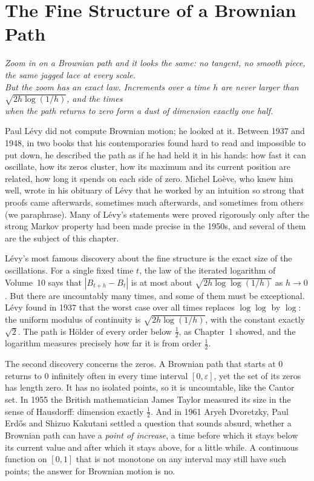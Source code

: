 \chapter{The Fine Structure of a Brownian Path}

\begin{center}\itshape
Zoom in on a Brownian path and it looks the same: no tangent, no smooth piece, the same jagged lace at every scale.\\
But the zoom has an exact law. Increments over a time $h$ are never larger than $\sqrt{2h\log(1/h)}$, and the times\\
when the path returns to zero form a dust of dimension exactly one half.
\end{center}

Paul L\'evy did not compute Brownian motion; he looked at it. Between 1937 and 1948, in two books that his contemporaries found hard to read and impossible to
put down, he described the path as if he had held it in his hands: how fast it can oscillate, how its zeros cluster, how its maximum and its current position are
related, how long it spends on each side of zero. Michel Lo\`eve, who knew him well, wrote in his obituary of L\'evy that he worked by an intuition so strong that proofs
came afterwards, sometimes much afterwards, and sometimes from others (we paraphrase). Many of L\'evy's statements were proved rigorously only after the strong Markov
property had been made precise in the 1950s, and several of them are the subject of this chapter.

L\'evy's most famous discovery about the fine structure is the exact size of the oscillations. For a single fixed time $t$, the law of the iterated logarithm of Volume~10
says that $|B_{t+h}-B_t|$ is at most about $\sqrt{2h\log\log(1/h)}$ as $h\to0$. But there are uncountably many times, and some of them must be exceptional. L\'evy found in
1937 that the worst case over all times replaces $\log\log$ by $\log$: the uniform modulus of continuity is $\sqrt{2h\log(1/h)}$, with the constant exactly $\sqrt2$. The path is
H\"older of every order below $\frac12$, as Chapter~1 showed, and the logarithm measures precisely how far it is from order $\frac12$.

The second discovery concerns the zeros. A Brownian path that starts at $0$ returns to $0$ infinitely often in every time interval $[0,\varepsilon]$, yet the set of its zeros
has length zero. It has no isolated points, so it is uncountable, like the Cantor set. In 1955 the British mathematician James Taylor measured its size in the sense of
Hausdorff: dimension exactly $\frac12$. And in 1961 Aryeh Dvoretzky, Paul Erd\H{o}s and Shizuo Kakutani settled a question that sounds absurd, whether a Brownian path
can have a \emph{point of increase}, a time before which it stays below its current value and after which it stays above, for a little while. A continuous function on
$[0,1]$ that is not monotone on any interval may still have such points; the answer for Brownian motion is no.

